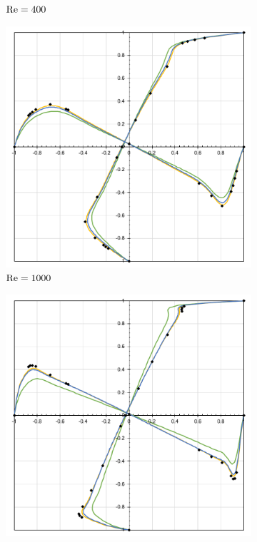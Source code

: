 \begin{figure}[h]
\begin{subfigure}{0.4\textwidth}
    \caption{$\mathrm{Re}=400$}
    \end{subfigure}
    \begin{subfigure}{0.4\textwidth}
    \includegraphics[width=\linewidth]{Figuras/Cavity/Re1000.pdf}
    \caption{$\mathrm{Re}=1000$}
    \end{subfigure}
    \begin{subfigure}{0.4\textwidth}
    \includegraphics[width=\linewidth]{Figuras/Cavity/Re5000.pdf}

\end{subfigure}
\end{figure}
